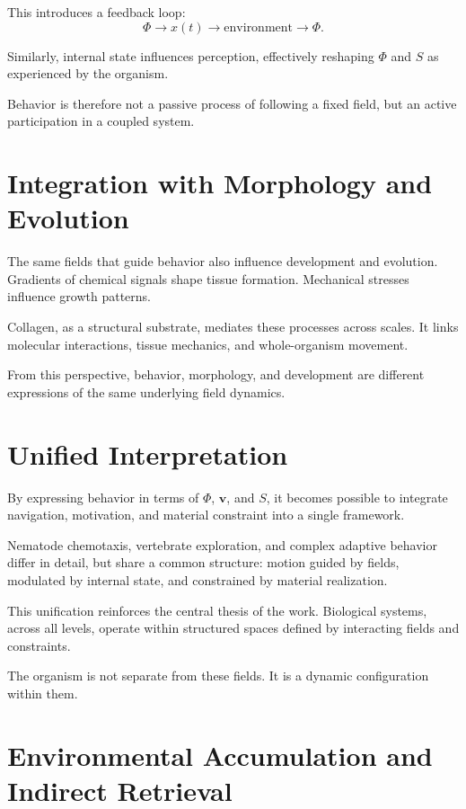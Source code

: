 \documentclass[11pt,oneside]{book}
\begin{document}
This introduces a feedback loop:
\[
\Phi \rightarrow x(t) \rightarrow \text{environment} \rightarrow \Phi.
\]

Similarly, internal state influences perception, effectively reshaping $\Phi$ and $S$ as experienced by the organism.

Behavior is therefore not a passive process of following a fixed field, but an active participation in a coupled system.

\section{Integration with Morphology and Evolution}

The same fields that guide behavior also influence development and evolution. Gradients of chemical signals shape tissue formation. Mechanical stresses influence growth patterns.

Collagen, as a structural substrate, mediates these processes across scales. It links molecular interactions, tissue mechanics, and whole-organism movement.

From this perspective, behavior, morphology, and development are different expressions of the same underlying field dynamics.

\section{Unified Interpretation}

By expressing behavior in terms of $\Phi$, $\mathbf{v}$, and $S$, it becomes possible to integrate navigation, motivation, and material constraint into a single framework.

Nematode chemotaxis, vertebrate exploration, and complex adaptive behavior differ in detail, but share a common structure: motion guided by fields, modulated by internal state, and constrained by material realization.

This unification reinforces the central thesis of the work. Biological systems, across all levels, operate within structured spaces defined by interacting fields and constraints.

The organism is not separate from these fields. It is a dynamic configuration within them.

\section{Environmental Accumulation and Indirect Retrieval}
\end{document}
